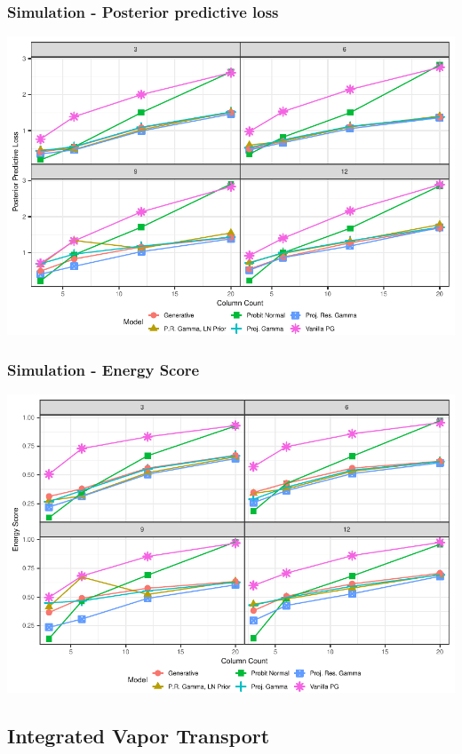 \documentclass[aspectratio=169]{beamer}
\newlength{\frametextheight}
\begin{document}
\begin{frame}
  \frametitle{Simulation - Posterior predictive loss}
  \begin{center}
    \includegraphics[height=\frametextheight]{./images/simulation_ppl}
  \end{center}
\end{frame}

\begin{frame}
  \frametitle{Simulation - Energy Score}
  \begin{center}
    \includegraphics[height=\frametextheight]{./images/simulation_es}
  \end{center}
\end{frame}

\subsection{Integrated Vapor Transport}
\end{document}
